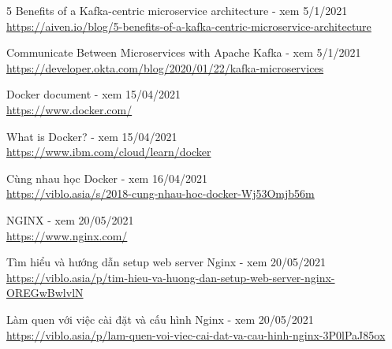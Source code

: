 \documentclass[12pt,a4paper,oneside]{book}
\begin{document}
\begin{thebibliography}{80}
        \bibitem{} 5 Benefits of a Kafka-centric microservice architecture - xem 5/1/2021\\
        \url{https://aiven.io/blog/5-benefits-of-a-kafka-centric-microservice-architecture}
        
        \bibitem{} Communicate Between Microservices with Apache Kafka - xem 5/1/2021\\
        \url{https://developer.okta.com/blog/2020/01/22/kafka-microservices}
        
        \bibitem{} Docker document - xem 15/04/2021\\
        \url{https://www.docker.com/}
        
        \bibitem{} What is Docker? - xem 15/04/2021\\
        \url{https://www.ibm.com/cloud/learn/docker}
        
        \bibitem{} Cùng nhau học Docker - xem 16/04/2021\\
        \url{https://viblo.asia/s/2018-cung-nhau-hoc-docker-Wj53Omjb56m}
        
         NGINX - xem 20/05/2021\\
        \url{https://www.nginx.com/}
        
        \bibitem{} Tìm hiểu và hướng dẫn setup web server Nginx - xem 20/05/2021\\
        \url{https://viblo.asia/p/tim-hieu-va-huong-dan-setup-web-server-nginx-OREGwBwlvlN}
        
        \bibitem{} Làm quen với việc cài đặt và cấu hình Nginx - xem 20/05/2021\\
        \url{https://viblo.asia/p/lam-quen-voi-viec-cai-dat-va-cau-hinh-nginx-3P0lPaJ85ox}
        

    \end{thebibliography}
\end{document}
